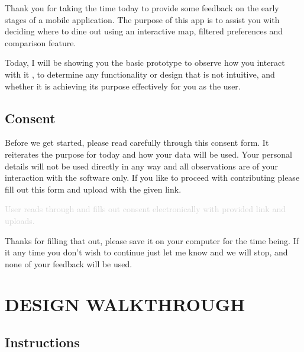         \begin{itshape}
            Thank you for taking the time today to provide some feedback on the early stages of a mobile application. The purpose of this app is to assist you with deciding where to dine out using an interactive map, filtered preferences and comparison feature.

            Today, I will be showing you the basic prototype to observe how you interact with it , to determine any functionality or design that is not intuitive, and whether it is achieving its purpose effectively for you as the user.
        \end{itshape}

    \subsection*{Consent}
        \begin{itshape}
            Before we get started, please read carefully through this consent form. It reiterates the purpose for today and how your data will be used. Your personal details will not be used directly in any way and all observations are of your interaction with the software only. If you like to proceed with contributing please fill out this form and upload with the given link.
        \end{itshape}

        \textcolor{lightgray}
            {User reads through and fills out consent electronically with provided link and uploads.}
        
        \begin{itshape}
            Thanks for filling that out, please save it on your computer for the time being. If it any time you don’t wish to continue just let me know and we will stop, and none of your feedback will be used.
        \end{itshape}

\section*{DESIGN WALKTHROUGH}
    \subsection*{Instructions}

